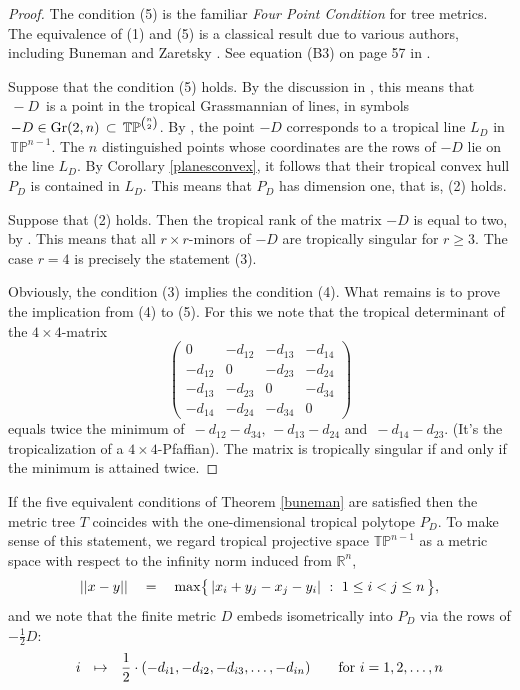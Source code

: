 \documentclass[11pt]{amsart}
\newcommand{\RR}{\mathbb{R}}
\newcommand{\TP}{\mathbb{TP}}
\begin{document}
\begin{proof}
The condition (5) is the familiar
\emph{Four Point Condition} for tree metrics.
The equivalence of (1) and (5) is a classical
result due to various authors, including
Buneman \cite{Bun} and Zaretsky \cite{Zar}.
See equation (B3) on page 57 in \cite{DHM}.

Suppose that the condition (5) holds.
By the discussion in \cite[\S 4]{SS}, this means that
$\, -D \,$ is a point in the
tropical Grassmannian of lines, in symbols
$\, -D \in {\rm Gr}(2,n) \,\subset \,\TP^{\binom{n}{2}}$.
By \cite[Theorem 3.8]{SS}, the point $-D$
corresponds to a tropical line $L_D $ in 
$\,\TP^{n-1}$. The $n$  distinguished points
whose coordinates are the rows of $-D$ lie on the
line $L_D$. By  Corollary \ref{planesconvex}, it follows
that their tropical convex hull $P_D$ is
contained in $L_D$. This means that
$P_D$ has dimension one, that is, (2) holds.

Suppose that (2) holds. Then the tropical rank of the matrix 
$-D$ is equal to two, by \cite[Theorem 4.2]{DSS}.
This means that all $r \times r$-minors of $-D$
are tropically singular for $r \geq 3$.
The case $r = 4$ is precisely the statement (3).

Obviously, the condition (3) implies
the condition (4). What remains is to prove the
implication from (4) to (5).
For this we note  that the tropical determinant of
the $4 \times 4$-matrix
$$ \begin{pmatrix}
 0 & -d_{12} & - d_{13} & -d_{14} \\
-d_{12} & 0 & - d_{23} & - d_{24} \\
-d_{13} & -d_{23} & 0 & - d_{34} \\
-d_{14} & -d_{24} & -d_{34} & 0 
\end{pmatrix}
$$
equals twice the minimum of 
$\,-d_{12} - d_{34},\, -d_{13} - d_{24}$ and $\, -d_{14} - d_{23}$.
(It's the tropicalization of a $4 \times 4$-Pfaffian).
The matrix is tropically singular
if and only if the minimum is attained twice.
\end{proof}

If the five equivalent conditions of
Theorem \ref{buneman} are satisfied
then the metric tree $T$ coincides with the 
one-dimensional tropical polytope $P_D$. 
To make sense of this statement, we regard
tropical projective space $\TP^{n-1}$ 
as a metric space with respect to the 
infinity norm induced from $\RR^n$,
$$ || x - y || \quad  = \quad
{\rm max} \bigl\{\, | x_i + y_j - x_j - y_i | \,\, :\,\,
1 \leq i < j \leq n \,\bigr\}, $$
and we note that the finite metric 
$D$ embeds isometrically into $P_D$ via the rows of $- \frac{1}{2} D$:
$$ i \,\,\,\, \mapsto \,\,\, \,
\frac{1}{2} \cdot ( -d_{i1}, -d_{i2}, -d_{i3},\ldots, -d_{in}) 
\qquad \hbox{for} \,\, i = 1,2,\ldots,n $$
\end{document}
